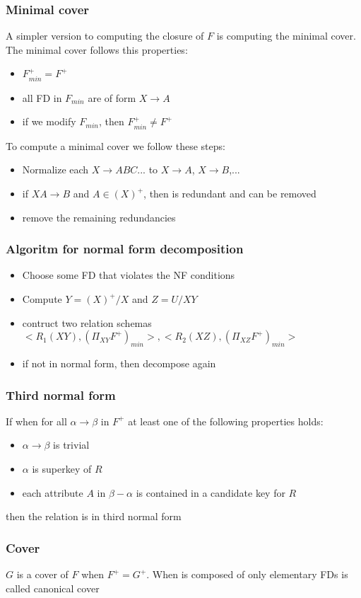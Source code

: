 \documentclass[12pt, a4paper]{article}
\begin{document}
\subsubsection*{Minimal cover}
A simpler version to computing the closure of $F$ is computing the minimal cover. The minimal cover follows this
properties: 
\begin{itemize}
    \item $F^{+}_{min}=F^{+}$
    \item all FD in $F_{min}$ are of form $X\to A$
    \item if we modify $F_{min}$, then $F^{+}_{min}\neq F^{+}$
\end{itemize}

To compute a minimal cover we follow these steps:
\begin{itemize}
    \item Normalize each $X\to ABC...$ to $X\to A$, $X\to B$,...
    \item if $XA\to B$ and $A\in (X)^{+}$, then is redundant and can be removed
    \item remove the remaining redundancies
\end{itemize}

\subsubsection*{Algoritm for normal form decomposition}
\begin{itemize}
    \item Choose some FD that violates the NF conditions
    \item Compute $Y=(X)^{+}/X$ and $Z=U/XY$
    \item contruct two relation schemas
    \subitem $<R_{1}(XY),(\Pi_{XY}F^{+})_{min}>,<R_{2}(XZ),(\Pi_{XZ}F^{+})_{min}>$
    \item if not in normal form, then decompose again
\end{itemize}

\subsubsection*{Third normal form}
If when for all $\alpha\to\beta$ in $F^{+}$ at least one of the following properties holds:
\begin{itemize}
    \item $\alpha\to\beta$ is trivial
    \item $\alpha$ is superkey of $R$
    \item each attribute $A$ in $\beta-\alpha$ is contained in a candidate key for $R$
\end{itemize}
then the relation is in third normal form

\subsubsection*{Cover}
$G$ is a cover of $F$ when $F^{+}=G^{+}$. When is composed of only elementary FDs is called canonical cover
\end{document}
